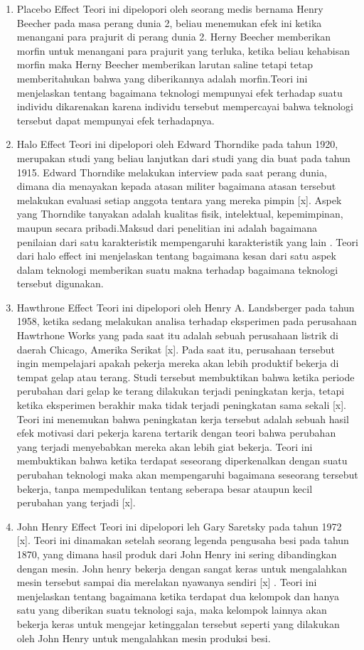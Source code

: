 	\begin{enumerate}
		\item Placebo Effect
			\subitem Teori ini dipelopori oleh seorang medis bernama Henry Beecher pada masa perang dunia 2, beliau menemukan efek ini ketika menangani para prajurit di perang dunia 2. Herny Beecher memberikan morfin untuk menangani para prajurit yang terluka, ketika beliau kehabisan morfin maka Herny Beecher memberikan larutan saline tetapi tetap memberitahukan bahwa yang diberikannya adalah morfin.Teori ini menjelaskan tentang bagaimana teknologi mempunyai efek terhadap suatu individu dikarenakan karena individu tersebut mempercayai bahwa teknologi tersebut dapat mempunyai efek terhadapnya.
		\item Halo Effect
			\subitem Teori ini dipelopori oleh Edward Thorndike pada tahun 1920, merupakan studi yang beliau lanjutkan dari studi yang dia buat pada tahun 1915. Edward Thorndike melakukan interview pada saat perang dunia, dimana dia menayakan kepada atasan militer bagaimana atasan tersebut melakukan evaluasi setiap anggota tentara yang mereka pimpin [x]. Aspek yang Thorndike tanyakan adalah kualitas fisik, intelektual, kepemimpinan, maupun secara pribadi.Maksud dari penelitian ini adalah bagaimana penilaian dari satu karakteristik mempengaruhi karakteristik yang lain . Teori dari halo effect ini menjelaskan tentang bagaimana kesan dari satu aspek dalam teknologi memberikan suatu makna terhadap bagaimana teknologi tersebut digunakan.
		\item Hawthrone Effect
			\subitem Teori ini dipelopori oleh Henry A. Landsberger pada tahun 1958, ketika sedang melakukan analisa terhadap eksperimen pada perusahaan Hawtrhone Works yang pada saat itu adalah sebuah perusahaan listrik di daerah Chicago, Amerika Serikat [x]. Pada saat itu, perusahaan tersebut ingin mempelajari apakah pekerja mereka akan lebih produktif bekerja di tempat gelap atau terang. Studi tersebut membuktikan bahwa ketika periode perubahan dari gelap ke terang dilakukan terjadi peningkatan kerja, tetapi ketika eksperimen berakhir maka tidak terjadi peningkatan sama sekali [x]. Teori ini menemukan bahwa peningkatan kerja tersebut adalah sebuah hasil efek motivasi dari pekerja karena tertarik dengan teori bahwa perubahan yang terjadi menyebabkan mereka akan lebih giat bekerja. Teori ini membuktikan bahwa ketika terdapat seseorang diperkenalkan dengan suatu perubahan teknologi maka akan mempengaruhi bagaimana seseorang tersebut bekerja, tanpa mempedulikan tentang seberapa besar ataupun kecil perubahan yang terjadi [x].
		\item John Henry Effect
			\subitem Teori ini dipelopori leh Gary Saretsky pada tahun 1972 [x]. Teori ini dinamakan setelah seorang legenda pengusaha besi pada tahun 1870, yang dimana hasil produk dari John Henry ini sering dibandingkan dengan mesin. John henry bekerja dengan sangat keras untuk mengalahkan mesin tersebut sampai dia merelakan nyawanya sendiri [x] . Teori ini menjelaskan tentang bagaimana ketika terdapat dua kelompok dan hanya satu yang diberikan suatu teknologi saja, maka kelompok lainnya akan bekerja keras untuk mengejar ketinggalan tersebut seperti yang dilakukan oleh John Henry untuk mengalahkan mesin produksi besi.
	\end{enumerate}
